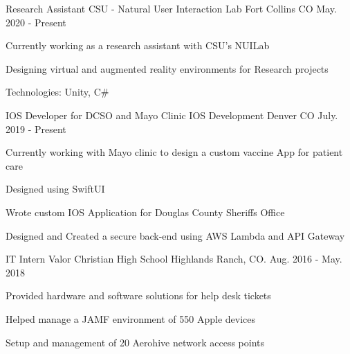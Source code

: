 \vspace{-2.0mm}

\begin{cventries}
\cventry
{Research Assistant} %
{CSU - Natural User Interaction Lab} %
{Fort Collins CO} %
{May. 2020 - Present} %
{
  \begin{cvitems} %
    \item {Currently working as a research assistant with CSU's NUILab}
    \item {Designing virtual and augmented reality environments for Research projects}
    \item {Technologies: Unity, C#}
    \end{cvitems}
}
  \cventry
    {IOS Developer for DCSO and Mayo Clinic} %
    {IOS Development} %
    {Denver CO} %
    {July. 2019 - Present} %
    {
      \begin{cvitems} %
        \item {Currently working with Mayo clinic to design a custom vaccine App for patient care}
        \item {Designed using SwiftUI}
        \item {Wrote custom IOS Application for Douglas County Sheriffs Office}
        \item {Designed and Created a secure back-end using AWS Lambda and API Gateway}
        \end{cvitems}
}
  \cventry
    {IT Intern} %
    {Valor Christian High School} %
    {Highlands Ranch, CO.} %
    {Aug. 2016 - May. 2018} %
    {
      \begin{cvitems} %
        \item {Provided hardware and software solutions for help desk tickets}
        \item {Helped manage a JAMF environment of 550 Apple devices}
        \item {Setup and management of 20 Aerohive network access points}
      \end{cvitems}
    }


\end{cventries}
